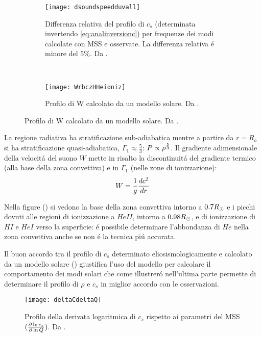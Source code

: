 \documentclass[../main.tex]{subfiles}
\begin{document}
\begin{figure}[!ht]
\begin{subfigure}[r]{0.5\textwidth}
        \texttt{[image: dsoundspeedduvall]}
        \caption{Differenza relativa del profilo di $c_s$ (determinata invertendo \eqref{eq:analinversionc}) per frequenze dei modi calcolate con MSS e osservate. La differenza relativa \'e minore del $5\%$. Da \cite{christensen1985speed}.}
\label{dsoundduvall}
    \end{subfigure}
~
\begin{subfigure}[r]{0.5\textwidth}
        \texttt{[image: WrbczHHeioniz]}
        \caption{Profilo di W calcolato da un modello solare. Da \cite{basu2008helioseismology}.}\label{fig:dlessc}
    \end{subfigure}
\end{figure}

La regione radiativa ha stratificazione sub-adiabatica mentre a partire da $r=R_b$ si ha stratificazione quasi-adiabatica,  $\Gamma_1\approx\frac{5}{3}$: $P\propto\rho\expy{\frac{5}{3}}$. Il gradiente adimensionale della velocit\'a del suono $W$ mette in risalto la discontinuit\'a del gradiente termico (alla base della zona convettiva) e in $\Gamma_1$ (nelle zone di ionizzazione):
\begin{equation}
W=\frac{1}{g}\TDy{r}{c^2}%
\end{equation}



Nella figure () si vedono la base della zona convettiva intorno a $0.7\rsun{}$ e i picchi dovuti alle regioni di ionizzazione a $HeII$, intorno a $0.98\rsun{}$, e di ionizzazione di $HI$ e $HeI$ verso la superficie: \'e possibile determinare l'abbondanza di $He$ nella zona convettiva anche se non \'e la tecnica pi\'u accurata.

Il buon accordo tra il profilo di $c_s$ determinato eliosismologicamente e calcolato da un modello solare () giustifica l'uso del modello per calcolare il comportamento dei modi solari che come illustrer\'o nell'ultima parte permette di determinare il profilo di $\rho$ e $c_s$ in miglior accordo con le osservazioni.

\begin{wrapfigure}[15]{r}{0.5\textwidth}
        \texttt{[image: deltaCdeltaQ]}
        \caption{Profilo della derivata logaritmica di $c_s$ rispetto ai parametri del MSS $(\PDly{Q}{c_s})$. Da \cite{villante2014chemical}.}
\end{wrapfigure}
\end{document}
